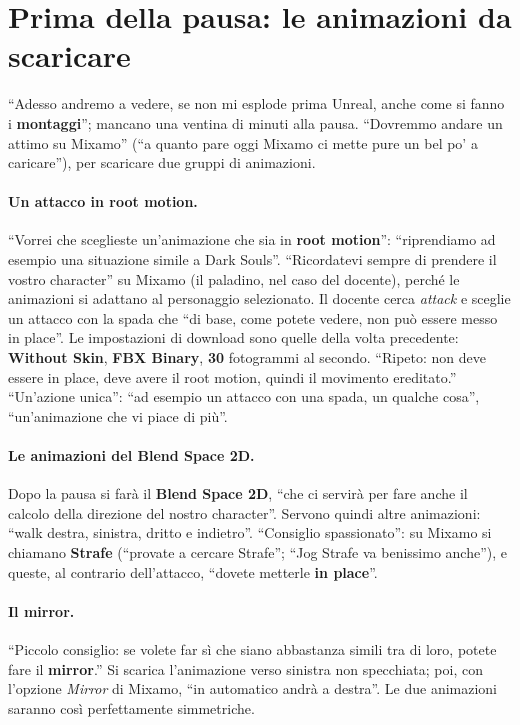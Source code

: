 \section{Prima della pausa: le animazioni da scaricare}
\label{ue9:sec:download}

``Adesso andremo a vedere, se non mi esplode prima Unreal, anche come si fanno i
\textbf{montaggi}''; mancano una ventina di minuti alla pausa. ``Dovremmo andare un attimo
su Mixamo'' (``a quanto pare oggi Mixamo ci mette pure un bel po' a caricare''), per
scaricare due gruppi di animazioni.

\paragraph{Un attacco in root motion.} ``Vorrei che sceglieste un'animazione che sia in
\textbf{root motion}'': ``riprendiamo ad esempio una situazione simile a Dark Souls''.
``Ricordatevi sempre di prendere il vostro character'' su Mixamo (il paladino, nel caso
del docente), perché le animazioni si adattano al personaggio selezionato. Il docente
cerca \emph{attack} e sceglie un attacco con la spada che ``di base, come potete vedere,
non può essere messo in place''. Le impostazioni di download sono quelle della volta
precedente: \textbf{Without Skin}, \textbf{FBX Binary}, \textbf{30} fotogrammi al
secondo. ``Ripeto: non deve essere in place, deve avere il root motion, quindi il
movimento ereditato.'' ``Un'azione unica'': ``ad esempio un attacco con una spada, un
qualche cosa'', ``un'animazione che vi piace di più''.

\paragraph{Le animazioni del Blend Space 2D.} Dopo la pausa si farà il \textbf{Blend
Space 2D}, ``che ci servirà per fare anche il calcolo della direzione del nostro
character''. Servono quindi altre animazioni: ``walk destra, sinistra, dritto e
indietro''. ``Consiglio spassionato'': su Mixamo si chiamano \textbf{Strafe} (``provate a
cercare Strafe''; ``Jog Strafe va benissimo anche''), e queste, al contrario
dell'attacco, ``dovete metterle \textbf{in place}''.

\paragraph{Il mirror.} ``Piccolo consiglio: se volete far sì che siano abbastanza simili
tra di loro, potete fare il \textbf{mirror}.'' Si scarica l'animazione verso sinistra
non specchiata; poi, con l'opzione \emph{Mirror} di Mixamo, ``in automatico andrà a
destra''. Le due animazioni saranno così perfettamente simmetriche.

